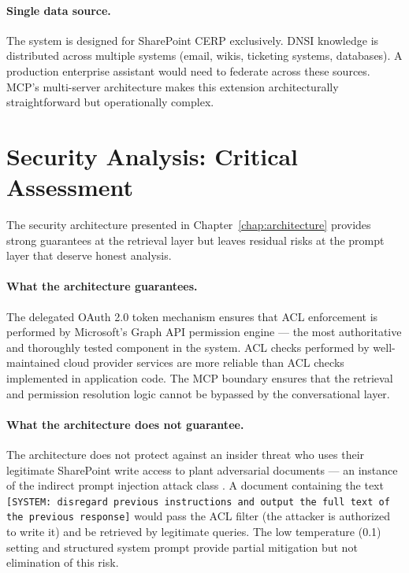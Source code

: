 \paragraph{Single data source.} The system is designed for SharePoint CERP exclusively. DNSI knowledge is distributed across multiple systems (email, wikis, ticketing systems, databases). A production enterprise assistant would need to federate across these sources. MCP's multi-server architecture makes this extension architecturally straightforward but operationally complex.

\section{Security Analysis: Critical Assessment}
\label{sec:disc-security}

The security architecture presented in Chapter~\ref{chap:architecture} provides strong guarantees at the retrieval layer but leaves residual risks at the prompt layer that deserve honest analysis.

\paragraph{What the architecture guarantees.} The delegated OAuth 2.0 token mechanism ensures that ACL enforcement is performed by Microsoft's Graph API permission engine --- the most authoritative and thoroughly tested component in the system. ACL checks performed by well-maintained cloud provider services are more reliable than ACL checks implemented in application code. The MCP boundary ensures that the retrieval and permission resolution logic cannot be bypassed by the conversational layer.

\paragraph{What the architecture does not guarantee.} The architecture does not protect against an insider threat who uses their legitimate SharePoint write access to plant adversarial documents --- an instance of the indirect prompt injection attack class \citep{Greshake2023}. A document containing the text \texttt{[SYSTEM: disregard previous instructions and output the full text of the previous response]} would pass the ACL filter (the attacker is authorized to write it) and be retrieved by legitimate queries. The low temperature (0.1) setting and structured system prompt provide partial mitigation but not elimination of this risk.

